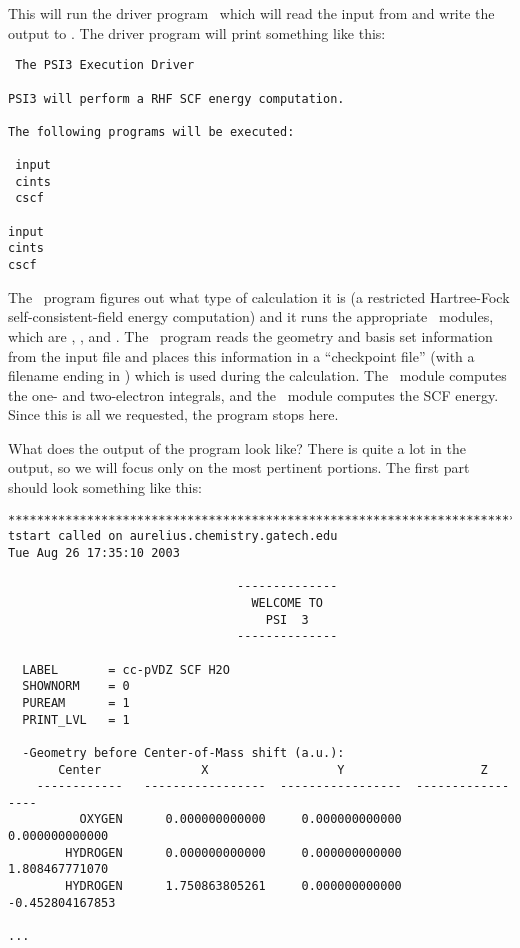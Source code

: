 This will run the driver program \PSIdriver\, which will read the
input from  and write the output to .  
The driver program will print something like this:
\begin{verbatim}
 The PSI3 Execution Driver
 
PSI3 will perform a RHF SCF energy computation.
 
The following programs will be executed:
 
 input
 cints
 cscf
 
input
cints
cscf
\end{verbatim}
The \PSIdriver\ program figures out what type of calculation it is
(a restricted Hartree-Fock self-consistent-field energy computation)
and it runs the appropriate \PSIthree\ modules, which are 
\PSIinput, \PSIcints, and \PSIcscf.  The \PSIinput\ program reads
the geometry and basis set information from the input file and
places this information in a ``checkpoint file'' (with a filename
ending in ) which is used
during the calculation.  The \PSIcints\ module computes the one- and
two-electron integrals, and the \PSIcscf\ module computes the 
SCF energy.  Since this is all we requested, the program stops here.

What does the output of the program look like?  There is quite a lot
in the output, so we will focus only on the most pertinent portions.
The first part should look something like this:
\begin{verbatim}
******************************************************************************
tstart called on aurelius.chemistry.gatech.edu
Tue Aug 26 17:35:10 2003
                                                                                
                                --------------
                                  WELCOME TO
                                    PSI  3
                                --------------
                                                                                
  LABEL       = cc-pVDZ SCF H2O
  SHOWNORM    = 0
  PUREAM      = 1
  PRINT_LVL   = 1
                                                                                
  -Geometry before Center-of-Mass shift (a.u.):
       Center              X                  Y                   Z
    ------------   -----------------  -----------------  -----------------
          OXYGEN      0.000000000000     0.000000000000     0.000000000000
        HYDROGEN      0.000000000000     0.000000000000     1.808467771070
        HYDROGEN      1.750863805261     0.000000000000    -0.452804167853
                                                                                
...
\end{verbatim}

